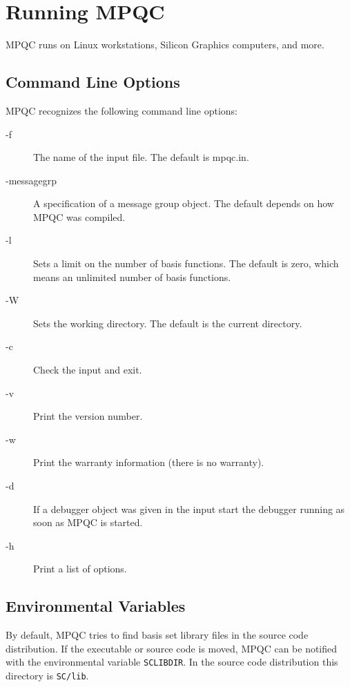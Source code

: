 
\chapter{Running MPQC}
\label{running mpqc}

MPQC runs on Linux workstations, Silicon Graphics computers,
and more.

\section{Command Line Options}

  MPQC recognizes the following command line options:

\begin{description}
\item[{\ttfamily -f}] The name of the input file.  The default is
                     {\ttfamily mpqc.in}.
\item[{\ttfamily -messagegrp}] A  specification
                      of a message group object.  The default depends
                      on how MPQC was compiled.
\item[{\ttfamily -l}] Sets a limit on the number of basis functions.
                     The default is zero, which means an unlimited number
                     of basis functions.
\item[{\ttfamily -W}] Sets the working directory.  The default is the
                      current directory.
\item[{\ttfamily -c}] Check the input and exit.
\item[{\ttfamily -v}] Print the version number.
\item[{\ttfamily -w}] Print the warranty information (there is no
                      warranty).
\item[{\ttfamily -d}] If a debugger object was given in the input
                      start the debugger running as soon as MPQC
                      is started.
\item[{\ttfamily -h}] Print a list of options.
\end{description}

\section{Environmental Variables}

By default, MPQC tries to find basis set library files in
the source code distribution.  If the executable or source
code is moved, MPQC can be notified with the environmental
variable \verb|SCLIBDIR|.  In the source code distribution
this directory is \verb|SC/lib|.

